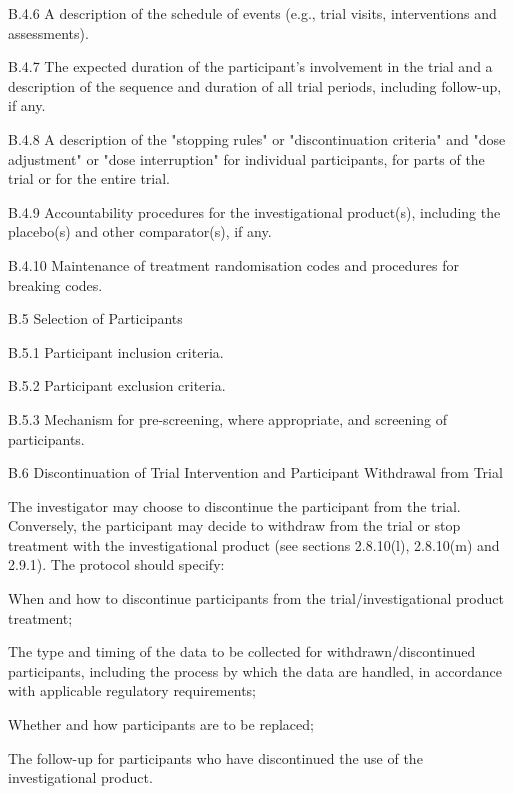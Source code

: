 \documentclass[11pt]{article}
\begin{document}
B.4.6 A description of the schedule of events (e.g., trial visits, interventions and assessments).


B.4.7 The expected duration of the participant's involvement in the trial and a description of the sequence and duration of all trial periods, including follow-up, if any.


B.4.8 A description of the "stopping rules" or "discontinuation criteria" and "dose adjustment" or "dose interruption" for individual participants, for parts of the trial or for the entire trial.


B.4.9 Accountability procedures for the investigational product(s), including the placebo(s) and other comparator(s), if any.


B.4.10 Maintenance of treatment randomisation codes and procedures for breaking codes.


B.5 Selection of Participants


B.5.1 Participant inclusion criteria.


B.5.2 Participant exclusion criteria.


B.5.3 Mechanism for pre-screening, where appropriate, and screening of participants.


B.6 Discontinuation of Trial Intervention and Participant Withdrawal from Trial


The investigator may choose to discontinue the participant from the trial. Conversely, the participant may decide to withdraw from the trial or stop treatment with the investigational product (see sections 2.8.10(l), 2.8.10(m) and 2.9.1). The protocol should specify:


\begin{description}[leftmargin=2.5cm,style=sameline]

\item[(a)] When and how to discontinue participants from the trial/investigational product treatment;

\item[(b)] The type and timing of the data to be collected for withdrawn/discontinued participants, including the process by which the data are handled, in accordance with applicable regulatory requirements;

\item[(c)] Whether and how participants are to be replaced;

\item[(d)] The follow-up for participants who have discontinued the use of the investigational product.

\end{description}
\end{document}
